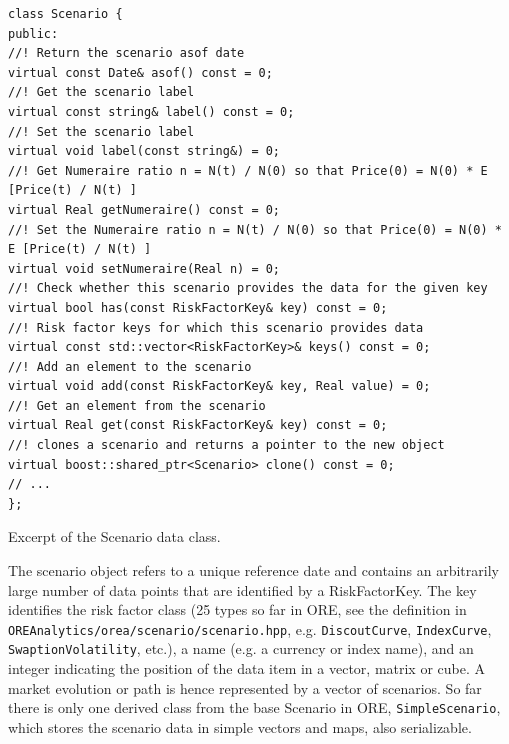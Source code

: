 \documentclass[12pt, a4paper]{report}
\begin{document}
\begin{listing}[H]
\begin{verbatim}
class Scenario {
public:
//! Return the scenario asof date
virtual const Date& asof() const = 0;
//! Get the scenario label
virtual const string& label() const = 0;
//! Set the scenario label
virtual void label(const string&) = 0;
//! Get Numeraire ratio n = N(t) / N(0) so that Price(0) = N(0) * E [Price(t) / N(t) ]
virtual Real getNumeraire() const = 0;
//! Set the Numeraire ratio n = N(t) / N(0) so that Price(0) = N(0) * E [Price(t) / N(t) ]
virtual void setNumeraire(Real n) = 0;
//! Check whether this scenario provides the data for the given key
virtual bool has(const RiskFactorKey& key) const = 0;
//! Risk factor keys for which this scenario provides data
virtual const std::vector<RiskFactorKey>& keys() const = 0;
//! Add an element to the scenario
virtual void add(const RiskFactorKey& key, Real value) = 0;
//! Get an element from the scenario
virtual Real get(const RiskFactorKey& key) const = 0;
//! clones a scenario and returns a pointer to the new object
virtual boost::shared_ptr<Scenario> clone() const = 0;
// ...
};
\end{verbatim}
\caption{Excerpt of the Scenario data class.}
\label{1st:scenario}
\end{listing}

The scenario object refers to a unique reference date and contains an arbitrarily large number of data points that are identified by a RiskFactorKey. The key identifies the risk factor class (25 types so far in ORE, see the definition in
{\tt OREAnalytics/orea/scenario/scenario.hpp}, e.g. {\tt DiscoutCurve}, {\tt IndexCurve}, {\tt SwaptionVolatility}, etc.), a name (e.g. a currency or index name), and an integer indicating the position of the data item in a vector, matrix or cube. A market
evolution or path is hence represented by a vector of scenarios. So far there is only one derived class from the base Scenario in ORE, {\tt SimpleScenario}, which stores the scenario data in simple vectors and maps, also serializable.
\end{document}

